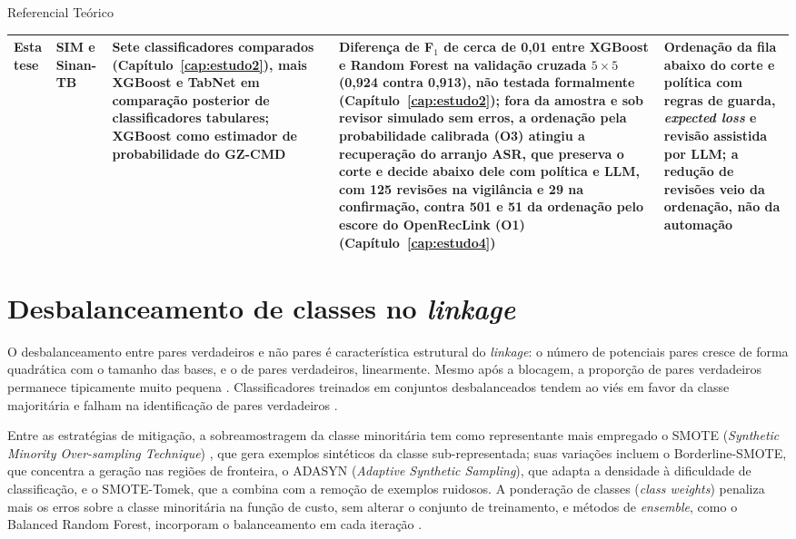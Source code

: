 \begin{chapter}{Referencial Teórico}
\begin{table}[htbp]
\begin{tabular}{>{\raggedright\arraybackslash}p{2.3cm}>{\raggedright\arraybackslash}p{2.7cm}>{\raggedright\arraybackslash}p{3.0cm}>{\raggedright\arraybackslash}p{3.0cm}>{\raggedright\arraybackslash}p{3.3cm}}
\hline
Esta tese & SIM e Sinan-TB & Sete classificadores comparados (Capítulo~\ref{cap:estudo2}), mais XGBoost e TabNet em comparação posterior de classificadores tabulares; XGBoost como estimador de probabilidade do GZ-CMD & Diferença de F$_1$ de cerca de 0,01 entre XGBoost e Random Forest na validação cruzada $5 \times 5$ (0,924 contra 0,913), não testada formalmente (Capítulo~\ref{cap:estudo2}); fora da amostra e sob revisor simulado sem erros, a ordenação pela probabilidade calibrada (O3) atingiu a recuperação do arranjo ASR, que preserva o corte e decide abaixo dele com política e LLM, com 125 revisões na vigilância e 29 na confirmação, contra 501 e 51 da ordenação pelo escore do OpenRecLink (O1) (Capítulo~\ref{cap:estudo4}) & Ordenação da fila abaixo do corte e política com regras de guarda, \textit{expected loss} e revisão assistida por LLM; a redução de revisões veio da ordenação, não da automação \\
\hline
\end{tabular}
\end{table}


\section{Desbalanceamento de classes no \textit{linkage}}\label{sec:desbalanceamento}

O desbalanceamento entre pares verdadeiros e não pares é característica estrutural do \textit{linkage}: o número de potenciais pares cresce de forma quadrática com o tamanho das bases, e o de pares verdadeiros, linearmente. Mesmo após a blocagem, a proporção de pares verdadeiros permanece tipicamente muito pequena \cite{Christen2012book}. Classificadores treinados em conjuntos desbalanceados tendem ao viés em favor da classe majoritária e falham na identificação de pares verdadeiros \cite{Hassani2025oversampling}.

Entre as estratégias de mitigação, a sobreamostragem da classe minoritária tem como representante mais empregado o SMOTE (\textit{Synthetic Minority Over-sampling Technique}) \cite{Chawla2002smote}, que gera exemplos sintéticos da classe sub-representada; suas variações incluem o Borderline-SMOTE, que concentra a geração nas regiões de fronteira, o ADASYN (\textit{Adaptive Synthetic Sampling}), que adapta a densidade à dificuldade de classificação, e o SMOTE-Tomek, que a combina com a remoção de exemplos ruidosos. A ponderação de classes (\textit{class weights}) penaliza mais os erros sobre a classe minoritária na função de custo, sem alterar o conjunto de treinamento, e métodos de \textit{ensemble}, como o Balanced Random Forest, incorporam o balanceamento em cada iteração \cite{He2009imbalanced, Galar2012ensembles}.


\end{chapter}
